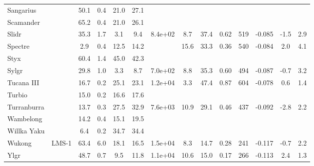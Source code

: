 \begin{tabular}{llSSSSSSSSrSSS}
Sangarius &  & 50.1 & 0.4 & 21.0 & 27.1 &  &  &  &  &  &  &  &  \\
Scamander &  & 65.2 & 0.4 & 21.0 & 26.1 &  &  &  &  &  &  &  &  \\
Slidr &  & 35.3 & 1.7 & 3.1 & 9.4 & 8.4e+02 & 8.7 & 37.4 & 0.62 & 519 & -0.085 & -1.5 & 2.9 \\
Spectre &  & 2.9 & 0.4 & 12.5 & 14.2 &  & 15.6 & 33.3 & 0.36 & 540 & -0.084 & 2.0 & 4.1 \\
Styx &  & 60.4 & 1.4 & 45.0 & 42.3 &  &  &  &  &  &  &  &  \\
Sylgr &  & 29.8 & 1.0 & 3.3 & 8.7 & 7.0e+02 & 8.8 & 35.3 & 0.60 & 494 & -0.087 & -0.7 & 3.2 \\
Tucana III &  & 16.7 & 0.2 & 25.1 & 23.1 & 1.2e+04 & 3.3 & 47.4 & 0.87 & 604 & -0.078 & 0.6 & 1.4 \\
Turbio &  & 15.0 & 0.2 & 16.6 & 17.6 &  &  &  &  &  &  &  &  \\
Turranburra &  & 13.7 & 0.3 & 27.5 & 32.9 & 7.6e+03 & 10.9 & 29.1 & 0.46 & 437 & -0.092 & -2.8 & 2.2 \\
Wambelong &  & 14.2 & 0.4 & 15.1 & 19.5 &  &  &  &  &  &  &  &  \\
Willka Yaku &  & 6.4 & 0.2 & 34.7 & 34.4 &  &  &  &  &  &  &  &  \\
Wukong & LMS-1 & 63.4 & 6.0 & 18.1 & 16.5 & 1.5e+04 & 8.3 & 14.7 & 0.28 & 241 & -0.117 & -0.7 & 2.2 \\
Ylgr &  & 48.7 & 0.7 & 9.5 & 11.8 & 1.1e+04 & 10.6 & 15.0 & 0.17 & 266 & -0.113 & 2.4 & 1.3 \\
\hline
\end{tabular}